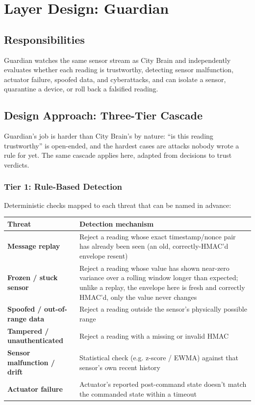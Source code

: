 \documentclass[10pt,letterpaper]{article}
\begin{document}
\section{Layer Design: Guardian}

\subsection{Responsibilities}

Guardian watches the same sensor stream as City Brain and independently evaluates whether each reading is trustworthy, detecting sensor malfunction, actuator failure, spoofed data, and cyberattacks, and can isolate a sensor, quarantine a device, or roll back a falsified reading.

\subsection{Design Approach: Three-Tier Cascade}

Guardian's job is harder than City Brain's by nature: ``is this reading trustworthy'' is open-ended, and the hardest cases are attacks nobody wrote a rule for yet. The same cascade applies here, adapted from decisions to trust verdicts.

\subsubsection*{Tier 1: Rule-Based Detection}

Deterministic checks mapped to each threat that can be named in advance:

\begin{longtable}{p{1.8in} p{4.4in}}
\toprule
\textbf{Threat} & \textbf{Detection mechanism} \\
\midrule
\endhead
\textbf{Message replay} & Reject a reading whose exact timestamp/nonce pair has already been seen (an old, correctly-HMAC'd envelope resent) \\
\textbf{Frozen / stuck sensor} & Reject a reading whose value has shown near-zero variance over a rolling window longer than expected; unlike a replay, the envelope here is fresh and correctly HMAC'd, only the value never changes \\
\textbf{Spoofed / out-of-range data} & Reject a reading outside the sensor's physically possible range \\
\textbf{Tampered / unauthenticated} & Reject a reading with a missing or invalid HMAC \\
\textbf{Sensor malfunction / drift} & Statistical check (e.g. z-score / EWMA) against that sensor's own recent history \\
\textbf{Actuator failure} & Actuator's reported post-command state doesn't match the commanded state within a timeout \\
\bottomrule
\end{longtable}
\end{document}

